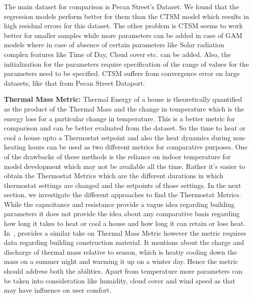 \indent The main dataset for comparison is Pecan Street's Dataset. We found that the regression models perform better for them than the CTSM model which results in high residual errors for this dataset. The other problem is CTSM seems to work better for smaller samples while more parameters can be added in case of GAM models where in case of absence of certain parameters like Solar radiation complex features like Time of Day, Cloud cover etc. can be added.  Also, the initialization for the parameters require specification of the range of values for the parameters need to be specified. CTSM suffers from convergence error on large datasets, like that from Pecan Street Dataport.

  
\indent \textbf{Thermal Mass Metric:} Thermal Energy of a house is theoretically quantified as the product of the Thermal Mass and the change in temperature which is the energy loss for a particular change in temperature. This is a better metric for comparison and can be better evaluated from the dataset. So the time to heat or cool a house upto a Thermostat setpoint and also the heat dynamics during non-heating hours can be used as two different metrics for comparative purposes. One of the drawbacks of these methods is the reliance on indoor temperature for model development which may not be available all the time. Rather it's easier to obtain the Thermostat Metrics which are the different durations in which thermostat settings are changed and the setpoints of those settings. In the next section, we investigate the different approaches to find the Thermostat Metrics. While the capacitance and resistance provide a vague idea regarding building parameters it does not provide the idea about any comparative basis regarding how long it takes to heat or cool a house and how long it can retain or lose heat. In~\cite{ThermalMASS}, provides a similar take on Thermal Mass Metric however the metric requires data regarding building construction material. It mentions about the charge and discharge of thermal mass relative to season, which is heatiy cooling down the mass on a summer night and warming it up on a winter day. Hence the metric should address both the abilities. Apart from temperature more parameters can be taken into consideration like humidity, cloud cover and wind speed as that may have influence on user comfort. 
 
